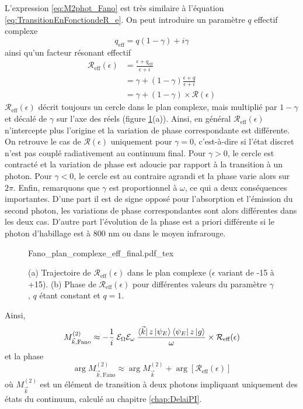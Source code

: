 L'expression \ref{eq:M2phot_Fano} est très similaire à l'équation \ref{eq:TransitionEnFonctiondeR_e}. On peut introduire un paramètre $q$ effectif complexe
\begin{equation}
q_{\text{eff}} = q(1-\gamma) + i \gamma
\end{equation}
ainsi qu'un facteur résonant effectif
\begin{align}
\mathcal{R}_{\text{eff}}(\epsilon) & = \frac{\epsilon + q_{\text{eff}}}{\epsilon + i}\\
& = \gamma + (1 - \gamma) \frac{\epsilon + q}{\epsilon + i}\\
& = \gamma + (1 - \gamma) \times \mathcal{R}(\epsilon) 
\end{align}
$\mathcal{R}_{\text{eff}}(\epsilon)$ décrit toujours un cercle dans le plan complexe, mais multiplié par $1 - \gamma$ et décalé de $\gamma$ sur l'axe des réels (figure \ref{fig:FanoComplexeEffectif}(a)). Ainsi, en général $\mathcal{R}_{\text{eff}}(\epsilon)$ n'intercepte plus l'origine et la variation de phase correspondante est différente. On retrouve le cas de $\mathcal{R}(\epsilon)$ uniquement pour $\gamma = 0$, c'est-à-dire si l'état discret n'est pas couplé radiativement au continuum final. Pour $\gamma > 0$, le cercle est contracté et la variation de phase est adoucie par rapport à la transition à un photon. Pour $\gamma < 0$, le cercle est au contraire agrandi et la phase varie alors sur $2 \pi$. Enfin, remarquons que $\gamma$ est proportionnel à $\omega$, ce qui a deux conséquences importantes. D'une part il est de signe opposé pour l'absorption et l'émission du second photon, les variations de phase correspondantes sont alors différentes dans les deux cas. D'autre part l'évolution de la phase est a priori différente si le photon d'habillage est à 800 nm ou dans le moyen infrarouge.

\begin{figure}
\centering
\def\svgwidth{\textwidth}
{Fano_plan_complexe_eff_final.pdf_tex}
\caption{(a) Trajectoire de $\mathcal{R}_{\text{eff}}(\epsilon)$ dans le plan complexe ($\epsilon$ variant de -15 à +15). (b) Phase de $\mathcal{R}_{\text{eff}}(\epsilon)$ pour différentes valeurs du paramètre $\gamma$, $q$ étant constant et $q = 1$.}
\label{fig:FanoComplexeEffectif}
\end{figure}

Ainsi,
\begin{equation}
M_{\vec{k}, \text{Fano}}^{(2)} \approx - \frac{1}{i} \: \mathcal{E}_\Omega \mathcal{E}_\omega \: \frac{\bra{\vec{k}} z \ket{\psi_E} \bra{\psi_E} z \ket{g}}{\omega} \times \mathcal{R}_{\text{eff}}(\epsilon)
\end{equation}
et la phase
\begin{equation}
\arg M_{\vec{k}, \text{Fano}}^{(2)} \approx \arg M_{\vec{k}}^{(2)} + \arg [\mathcal{R}_{\text{eff}}(\epsilon)]
\label{eq:Arg2photonsFano}
\end{equation}
où $M_{\vec{k}}^{(2)}$ est un élément de transition à deux photons impliquant uniquement des états du continuum, calculé au chapitre \ref{chap:DelaiPI}.

